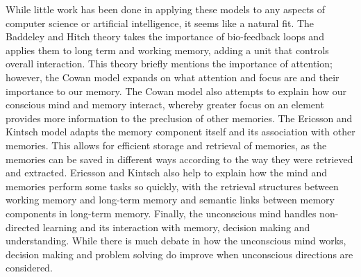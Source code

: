 While little work
has been done in applying these models to any aspects of computer science or
artificial intelligence, it seems like a natural fit.  The Baddeley and Hitch
theory takes the importance of bio-feedback loops and applies them to long term
and working memory, adding a unit that controls overall interaction.  This
theory briefly mentions the importance of attention; however, the Cowan model
expands on what attention and focus are and their importance to our memory.
The Cowan model also attempts to explain how our conscious mind and memory
interact, whereby greater focus on an element provides more information to the
preclusion of other memories. The Ericsson and Kintsch model adapts the memory
component itself and its association with other memories. This allows for
efficient storage and retrieval of memories, as the memories can be saved in
different ways according to the way they were retrieved and extracted.  Ericsson
and Kintsch also help to explain how the mind and memories perform some tasks so
quickly, with the retrieval structures between working memory and long-term
memory and semantic links between memory components in long-term memory.
Finally, the unconscious mind handles non-directed learning and its interaction
with memory, decision making and understanding. While there is much debate in
how the unconscious mind works, decision making and problem solving do improve
when unconscious directions are considered.
